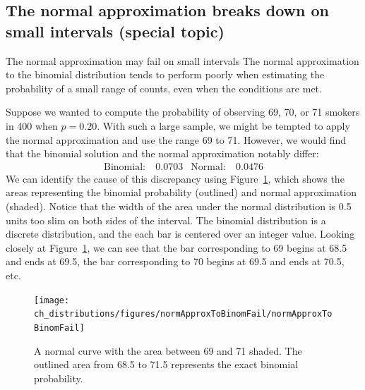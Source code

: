 %
%
%
%


\subsection{The normal approximation breaks down on small intervals (special topic)}

\begin{caution}{The normal approximation may fail on small intervals}
{The normal approximation to the binomial distribution tends to perform poorly when estimating the probability of a small range of counts, even when the conditions are met.}
\end{caution}

Suppose we wanted to compute the probability of observing 69, 70, or 71 smokers in 400 when $p=0.20$. With such a large sample, we might be tempted to apply the normal approximation and use the range 69 to 71. However, we would find that the binomial solution and the normal approximation notably differ:
\begin{align*}
\text{Binomial:}&\ 0.0703
&\text{Normal:}&\ 0.0476
\end{align*}
We can identify the cause of this discrepancy using Figure~\ref{normApproxToBinomFail}, which shows the areas representing the binomial probability (outlined) and normal approximation (shaded). Notice that the width of the area under the normal distribution is 0.5 units too slim on both sides of the interval. The binomial distribution is a discrete distribution, and the each bar is centered over an integer value. Looking closely at Figure~\ref{normApproxToBinomFail}, we can see that the bar corresponding to 69 begins at 68.5 and ends at 69.5, the bar corresponding to 70 begins at 69.5 and ends at 70.5, etc.

\begin{figure}[h]
\centering
\texttt{[image: ch\_distributions/figures/normApproxToBinomFail/normApproxToBinomFail]}
\caption{A normal curve with the area between 69 and 71 shaded. The outlined area from 68.5 to 71.5 represents the exact binomial probability.}
\label{normApproxToBinomFail}
\end{figure}

